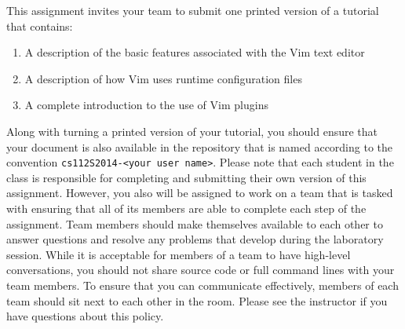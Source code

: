 This assignment invites your team to submit one printed version of a tutorial that contains:

\begin{enumerate}
	
	\item A description of the basic features associated with the Vim text editor

	\item A description of how Vim uses runtime configuration files

	\item A complete introduction to the use of Vim plugins 

\end{enumerate}

Along with turning a printed version of your tutorial, you should ensure that your document is also available in the repository
that is named according to the convention {\tt cs112S2014-<your user name>}. Please note that each student in the class is
responsible for completing and submitting their own version of this assignment.  However, you also will be assigned to work on a
team that is tasked with ensuring that all of its members are able to complete each step of the assignment.  Team members should
make themselves available to each other to answer questions and resolve any problems that develop during the laboratory session.
While it is acceptable for members of a team to have high-level conversations, you should not share source code or full command
lines with your team members. To ensure that you can communicate effectively, members of each team should sit next to each other
in the room.  Please see the instructor if you have questions about this policy.


